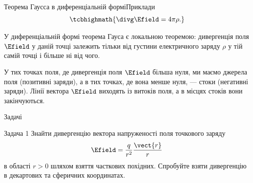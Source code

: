 \documentclass{beamer}
\begin{document}
\begin{frame}{Теорема Гаусса в диференціальній формі}{Приклади}
	\begin{equation*}
		\tcbhighmath{
			\divg\Efield = 4\pi\rho.
		}
	\end{equation*}

	\begin{overprint}
		\begin{block}{}\justifying
			У диференціальній формі теорема Гауса є \alert{локальною теоремою}:
			дивергенція поля $\Efield$ у даній точці залежить тільки від густини
			електричного заряду $\rho$ у тій самій точці і більше ні від чого.
			\begin{center}
				
			\end{center}
		\end{block}


		\begin{center}
			
		\end{center}
		\begin{block}{}\justifying
			У тих точках поля, де дивергенція поля $\Efield$ \alert{більша нуля}, ми
			маємо \alert{джерела поля} (позитивні заряди), а в тих точках, де вона
			\alert{менше нуля}, --- стоки (негативні заряди). Лінії вектора $\Efield$
			виходять із витоків поля, а в місцях стоків вони закінчуються.
		\end{block}
	\end{overprint}

\end{frame}





\begin{frame}{Задачі}{}
       \begin{exampleblock}{Задача 1}\justifying
            Знайти дивергенцію вектора напруженості поля точкового заряду
            \begin{equation*}
                \Efield = \frac{q}{r^2} \frac{\vect{r}}{r}
        \end{equation*}
            в області $r >0$ шляхом взяття часткових похідних.
            Спробуйте взяти дивергенцію в декартових та сферичних координатах.
        \end{exampleblock}
\end{frame}
\end{document}
